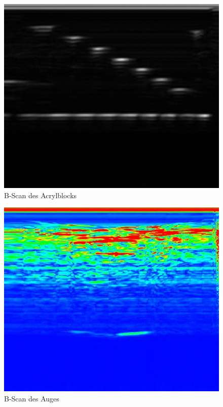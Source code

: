 \documentclass[11pt,ngerman,a4paper]{article}
\begin{document}
\begin{figure}[h]
\includegraphics[width=12cm]{bscan1.jpg}
\caption{B-Scan des Acrylblocks}
\label{fig3}
\end{figure}
\newpage
\begin{figure}[h]
\includegraphics[width=12cm]{bscan2.jpg}
\caption{B-Scan des Auges}
\label{fig4}
\end{figure}
\end{document}
